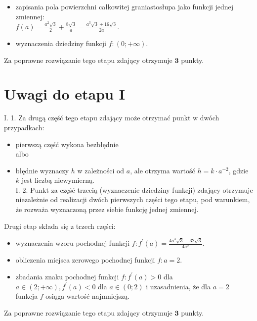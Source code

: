 \documentclass[10pt]{article}
\begin{document}
\begin{itemize}
  \item zapisania pola powierzchni całkowitej graniastosłupa jako funkcji jednej zmiennej:\\
$f(a)=\frac{a^{2} \sqrt{3}}{2}+\frac{8 \sqrt{3}}{a}=\frac{a^{3} \sqrt{3}+16 \sqrt{3}}{2 a}$.
  \item wyznaczenia dziedziny funkcji $f:(0 ;+\infty)$.
\end{itemize}

Za poprawne rozwiązanie tego etapu zdający otrzymuje $\mathbf{3}$ punkty.

\section*{Uwagi do etapu I}
I. 1. Za drugą część tego etapu zdający może otrzymać punkt w dwóch przypadkach:

\begin{itemize}
  \item pierwszą część wykona bezbłędnie\\
albo
  \item błędnie wyznaczy $h$ w zależności od $a$, ale otrzyma wartość $h=k \cdot a^{-2}$, gdzie $k$ jest liczbą niewymierną.\\
I. 2. Punkt za część trzecią (wyznaczenie dziedziny funkcji) zdający otrzymuje niezależnie od realizacji dwóch pierwszych części tego etapu, pod warunkiem, że rozważa wyznaczoną przez siebie funkcję jednej zmiennej.
\end{itemize}

Drugi etap składa się z trzech części:

\begin{itemize}
  \item wyznaczenia wzoru pochodnej funkcji $f: f^{\prime}(a)=\frac{4 a^{3} \sqrt{3}-32 \sqrt{3}}{4 a^{2}}$.
  \item obliczenia miejsca zerowego pochodnej funkcji $f: a=2$.
  \item zbadania znaku pochodnej funkcji $f: f^{\prime}(a)>0$ dla $a \in(2 ;+\infty), f^{\prime}(a)<0$ dla $a \in(0 ; 2)$ i uzasadnienia, że dla $a=2$ funkcja $f$ osiąga wartość najmniejszą.
\end{itemize}

Za poprawne rozwiązanie tego etapu zdający otrzymuje $\mathbf{3}$ punkty.
\end{document}
